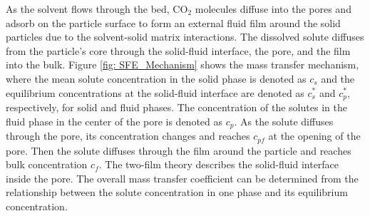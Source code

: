 \documentclass[../Article_Model_Parameters.tex]{subfiles}
\begin{document}
	
	As the solvent flows through the bed, CO$_2$ molecules diffuse into the pores and adsorb on the particle surface to form an external fluid film around the solid particles due to the solvent-solid matrix interactions. The dissolved solute diffuses from the particle's core through the solid-fluid interface, the pore, and the film into the bulk. Figure \ref{fig: SFE_Mechanism} shows the mass transfer mechanism, where the mean solute concentration in the solid phase is denoted as $c_s$ and the equilibrium concentrations at the solid-fluid interface are denoted as $c_s^*$ and $c_p^*$, respectively, for solid and fluid phases. The concentration of the solutes in the fluid phase in the center of the pore is denoted as $c_p$. As the solute diffuses through the pore, its concentration changes and reaches $c_{pf}$ at the opening of the pore. Then the solute diffuses through the film around the particle and reaches bulk concentration $c_f$. The two-film theory describes the solid-fluid interface inside the pore. The overall mass transfer coefficient can be determined from the relationship between the solute concentration in one phase and its equilibrium concentration.
			
\end{document}
